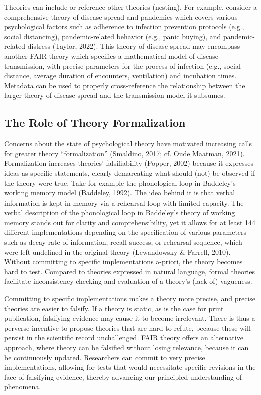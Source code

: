 \documentclass[man]{apa7}
\begin{document}
Theories can include or reference other theories (nesting).
For example, consider a comprehensive theory of disease spread and pandemics which covers various psychological factors
such as adherence to infection prevention protocols (e.g., social distancing),
pandemic-related behavior (e.g., panic buying),
and pandemic-related distress
(Taylor, 2022).
This theory of disease spread may encompass another FAIR theory which specifies a mathematical model of disease transmission, with precise parameters for the process of infection (e.g., social distance, average duration of encounters, ventilation) and incubation times.
Metadata can be used to properly cross-reference the relationship between the larger theory of disease spread and the transmission model it subsumes.

\subsection{The Role of Theory Formalization}\label{the-role-of-theory-formalization}

Concerns about the state of psychological theory have motivated increasing calls for greater theory ``formalization'' (Smaldino, 2017; cf. Oude Maatman, 2021).
Formalization increases theories' falsifiability (Popper, 2002) because it expresses ideas as specific statements, clearly demarcating what should (not) be observed if the theory were true.
\label{phonoloop}{Take for example the phonological loop in Baddeley's working memory model (Baddeley, 1992). The idea behind it is that verbal information is kept in memory via a rehearsal loop with limited capacity. The verbal description of the phonological loop in Baddeley's theory of working memory stands out for clarity and comprehensibility, yet it allows for at least 144 different implementations depending on the specification of various parameters such as decay rate of information, recall success, or rehearsal sequence, which were left undefined in the original theory (Lewandowsky \& Farrell, 2010).}
Without committing to specific implementations a-priori,
the theory becomes hard to test.
Compared to theories expressed in natural language,
formal theories facilitate inconsistency checking and evaluation of a theory's (lack of) vagueness.

Committing to specific implementations makes a theory more precise, and precise theories are easier to falsify.
If a theory is static, as is the case for print publication,
falsifying evidence may cause it to become irrelevant.
There is thus a perverse incentive to propose theories that are hard to refute, because these will persist in the scientific record unchallenged.
FAIR theory offers an alternative approach, where theory can be falsified without losing relevance, because it can be continuously updated.
Researchers can commit to very precise implementations,
allowing for tests that would necessitate specific revisions in the face of falsifying evidence,
thereby advancing our principled understanding of phenomena.
\end{document}

